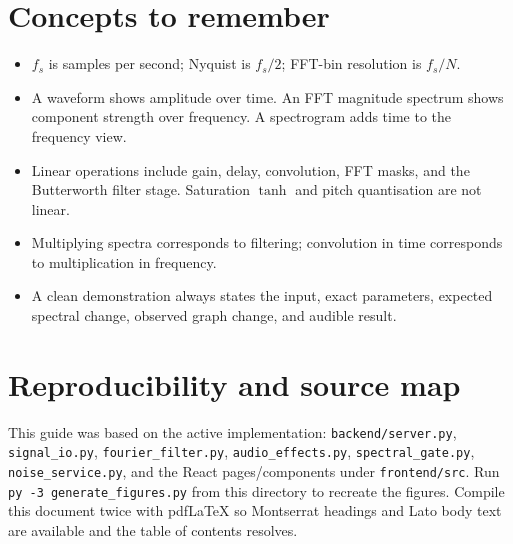 \documentclass[11pt,a4paper]{article}
\newcommand{\code}[1]{\texttt{#1}}
\begin{document}
\section{Concepts to remember}
\begin{itemize}
\item \(f_s\) is samples per second; Nyquist is \(f_s/2\); FFT-bin resolution is \(f_s/N\).
\item A waveform shows amplitude over time. An FFT magnitude spectrum shows component strength over frequency. A spectrogram adds time to the frequency view.
\item Linear operations include gain, delay, convolution, FFT masks, and the Butterworth filter stage. Saturation \(\tanh\) and pitch quantisation are not linear.
\item Multiplying spectra corresponds to filtering; convolution in time corresponds to multiplication in frequency.
\item A clean demonstration always states the input, exact parameters, expected spectral change, observed graph change, and audible result.
\end{itemize}

\appendix
\section{Reproducibility and source map}
This guide was based on the active implementation: \code{backend/server.py}, \code{signal\_io.py}, \code{fourier\_filter.py}, \code{audio\_effects.py}, \code{spectral\_gate.py}, \code{noise\_service.py}, and the React pages/components under \code{frontend/src}. Run \code{py -3 generate\_figures.py} from this directory to recreate the figures. Compile this document twice with pdfLaTeX so Montserrat headings and Lato body text are available and the table of contents resolves.
\end{document}
